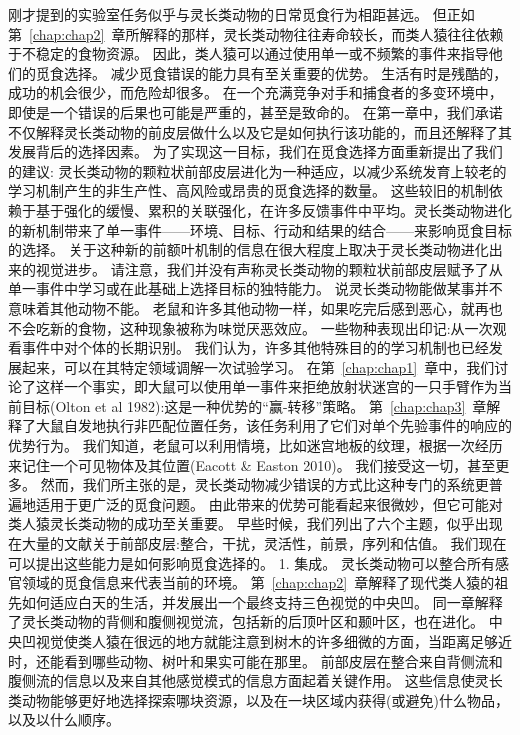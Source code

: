 刚才提到的实验室任务似乎与灵长类动物的日常觅食行为相距甚远。
但正如第~\ref{chap:chap2}~章所解释的那样，灵长类动物往往寿命较长，而类人猿往往依赖于不稳定的食物资源。
因此，类人猿可以通过使用单一或不频繁的事件来指导他们的觅食选择。
减少觅食错误的能力具有至关重要的优势。
生活有时是残酷的，成功的机会很少，而危险却很多。
在一个充满竞争对手和捕食者的多变环境中，即使是一个错误的后果也可能是严重的，甚至是致命的。
在第一章中，我们承诺不仅解释灵长类动物的前皮层做什么以及它是如何执行该功能的，而且还解释了其发展背后的选择因素。
为了实现这一目标，我们在觅食选择方面重新提出了我们的建议:
灵长类动物的颗粒状前部皮层进化为一种适应，以减少系统发育上较老的学习机制产生的非生产性、高风险或昂贵的觅食选择的数量。
这些较旧的机制依赖于基于强化的缓慢、累积的关联强化，在许多反馈事件中平均。灵长类动物进化的新机制带来了单一事件——环境、目标、行动和结果的结合——来影响觅食目标的选择。
关于这种新的前额叶机制的信息在很大程度上取决于灵长类动物进化出来的视觉进步。
请注意，我们并没有声称灵长类动物的颗粒状前部皮层赋予了从单一事件中学习或在此基础上选择目标的独特能力。
说灵长类动物能做某事并不意味着其他动物不能。
老鼠和许多其他动物一样，如果吃完后感到恶心，就再也不会吃新的食物，这种现象被称为味觉厌恶效应\cite{rozin1971specific}。
一些物种表现出印记:从一次观看事件中对个体的长期识别\cite{bateson1969development}。
我们认为，许多其他特殊目的的学习机制也已经发展起来，可以在其特定领域调解一次试验学习。
在第~\ref{chap:chap1}~章中，我们讨论了这样一个事实，即大鼠可以使用单一事件来拒绝放射状迷宫的一只手臂作为当前目标(Olton et al 1982):这是一种优势的“赢-转移”策略。
第~\ref{chap:chap3}~章解释了大鼠自发地执行非匹配位置任务，该任务利用了它们对单个先验事件的响应的优势行为。
我们知道，老鼠可以利用情境，比如迷宫地板的纹理，根据一次经历来记住一个可见物体及其位置(Eacott \& Easton 2010)。
我们接受这一切，甚至更多。
然而，我们所主张的是，灵长类动物减少错误的方式比这种专门的系统更普遍地适用于更广泛的觅食问题。
由此带来的优势可能看起来很微妙，但它可能对类人猿灵长类动物的成功至关重要。
早些时候，我们列出了六个主题，似乎出现在大量的文献关于前部皮层:整合，干扰，灵活性，前景，序列和估值。
我们现在可以提出这些能力是如何影响觅食选择的。
1. 集成。
灵长类动物可以整合所有感官领域的觅食信息来代表当前的环境。
第~\ref{chap:chap2}~章解释了现代类人猿的祖先如何适应白天的生活，并发展出一个最终支持三色视觉的中央凹。
同一章解释了灵长类动物的背侧和腹侧视觉流，包括新的后顶叶区和颞叶区，也在进化。
中央凹视觉使类人猿在很远的地方就能注意到树木的许多细微的方面，当距离足够近时，还能看到哪些动物、树叶和果实可能在那里。
前部皮层在整合来自背侧流和腹侧流的信息以及来自其他感觉模式的信息方面起着关键作用。
这些信息使灵长类动物能够更好地选择探索哪块资源，以及在一块区域内获得(或避免)什么物品，以及以什么顺序。
